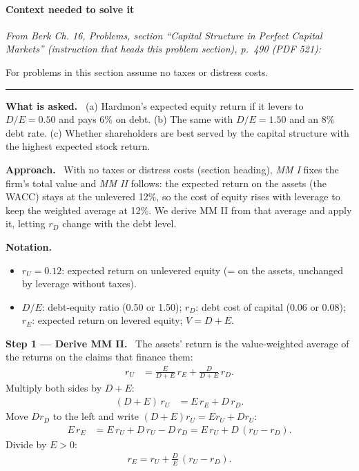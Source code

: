 \documentclass[11pt,a4paper]{article}
\numberwithin{equation}{section}
\newcommand{\notation}{\par\smallskip\noindent\textbf{Notation.}}
\newcommand{\step}[2]{\par\smallskip\noindent\textbf{Step #1 --- #2.}~}
\newcommand{\asked}{\par\medskip\noindent\textbf{What is asked.}~}
\newcommand{\approach}{\par\smallskip\noindent\textbf{Approach.}~}
\newcommand{\stmtend}{\par\endgroup\nopagebreak\noindent\rule{\linewidth}{0.4pt}\par\medskip}
\begin{document}
\paragraph{Context needed to solve it}

\emph{From Berk Ch. 16, Problems, section ``Capital Structure in Perfect Capital Markets''
(instruction that heads this problem section), p.~490 (PDF 521):}

For problems in this section assume no taxes or distress costs.
\stmtend

\asked
(a) Hardmon's expected equity return if it levers to $D/E=0.50$ and pays 6\% on debt.
(b) The same with $D/E=1.50$ and an 8\% debt rate.
(c) Whether shareholders are best served by the capital structure with the highest expected
stock return.

\approach
With no taxes or distress costs (section heading), \emph{MM I} fixes the firm's total value and
\emph{MM II} follows: the expected return on the assets (the WACC) stays at the unlevered 12\%,
so the cost of equity rises with leverage to keep the weighted average at 12\%. We derive MM II
from that average and apply it, letting $r_D$ change with the debt level.

\notation
\begin{itemize}
  \item $r_U=0.12$: expected return on unlevered equity (= on the assets, unchanged by leverage without taxes).
  \item $D/E$: debt-equity ratio (0.50 or 1.50); $r_D$: debt cost of capital (0.06 or 0.08); $r_E$: expected return on levered equity; $V=D+E$.
\end{itemize}

\step{1}{Derive MM II} The assets' return is the value-weighted average of the returns on the
claims that finance them:
\begin{align}
  r_U &= \frac{E}{D+E}\,r_E+\frac{D}{D+E}\,r_D. \nonumber
\end{align}
Multiply both sides by $D+E$:
\begin{align}
  (D+E)\,r_U &= E\,r_E + D\,r_D. \nonumber
\end{align}
Move $D r_D$ to the left and write $(D+E)r_U=E r_U+D r_U$:
\begin{align}
  E\,r_E &= E\,r_U + D\,r_U - D\,r_D = E\,r_U + D\,(r_U-r_D). \nonumber
\end{align}
Divide by $E>0$:
\begin{align}
  r_E = r_U + \frac{D}{E}\,(r_U-r_D). \label{eq:5MM2}
\end{align}
\end{document}
